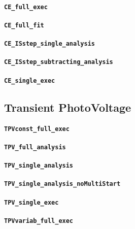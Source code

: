 		\paragraph{\texttt{CE\_full\_exec}}
		\paragraph{\texttt{CE\_full\_fit}}
		\paragraph{\texttt{CE\_ISstep\_single\_analysis}}
		\paragraph{\texttt{CE\_ISstep\_subtracting\_analysis}}
		\paragraph{\texttt{CE\_single\_exec}}


	\subsection{Transient PhotoVoltage}

		\paragraph{\texttt{TPVconst\_full\_exec}}
		\paragraph{\texttt{TPV\_full\_analysis}}
		\paragraph{\texttt{TPV\_single\_analysis}}
		\paragraph{\texttt{TPV\_single\_analysis\_noMultiStart}}
		\paragraph{\texttt{TPV\_single\_exec}}
		\paragraph{\texttt{TPVvariab\_full\_exec}}





